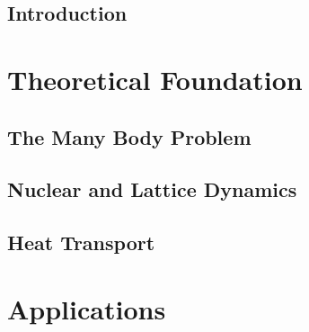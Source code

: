 \documentclass[nobib,a4paper,twoside,notoc,justified,marginals=justified]{tufte-book}
\newcommand{\blankpage}{\newpage\hbox{}\thispagestyle{empty}\newpage}
\begin{document}
\frontmatter
{}
  
%  

\tableofcontents





\cleardoublepage

 \chapter{Introduction}
 

\mainmatter
{}  %

\part{Theoretical Foundation}

\chapter{The Many Body Problem}


\chapter{Nuclear and Lattice Dynamics}


\chapter{Heat Transport}


\part{Applications}
\end{document}
